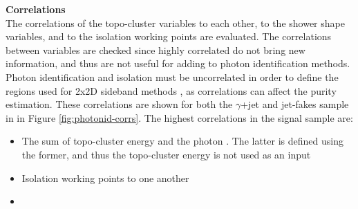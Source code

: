 \noindent\textbf{Correlations}\\
\indent The correlations of the topo-cluster variables to each other, to the shower shape variables, and to the isolation working points are evaluated. The correlations between variables are checked since highly correlated do not bring new information, and thus are not useful for adding to photon identification methods. Photon identification and isolation must be uncorrelated in order to define the regions used for 2x2D sideband methods \cite{2x2d-definition}, as correlations can affect the purity estimation. These correlations are shown for both the $\gamma$+jet and jet-fakes sample in in Figure \ref{fig:photonid-corrs}. The highest correlations in the signal sample are:
\begin{itemize}
    \item The sum of topo-cluster energy and the photon \pt. The latter is defined using the former, and thus the topo-cluster energy is not used as an input
    \item Isolation working points to one another 
    \item 
\end{itemize}

